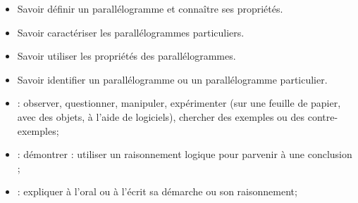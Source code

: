 \begin{myobj}
	\begin{itemize}
		
		\item Savoir définir un parallélogramme et connaître ses propriétés.
		\item Savoir caractériser les parallélogrammes particuliers.
		\item Savoir utiliser les propriétés des parallélogrammes.
		\item Savoir identifier un parallélogramme ou un parallélogramme particulier.
			
	\end{itemize}
\end{myobj}

\vspace*{-0.3cm}

\begin{mycomp}
	\begin{itemize}
		\item {} :  observer, questionner, manipuler, expérimenter (sur une feuille de papier, avec des objets, à l’aide de logiciels), chercher des exemples ou des contre-exemples;
		\item {} :  démontrer : utiliser un raisonnement logique pour parvenir à une conclusion ;
		\item {} :  expliquer à l’oral ou à l’écrit sa démarche ou son raisonnement; 
		
	\end{itemize}
\end{mycomp}


